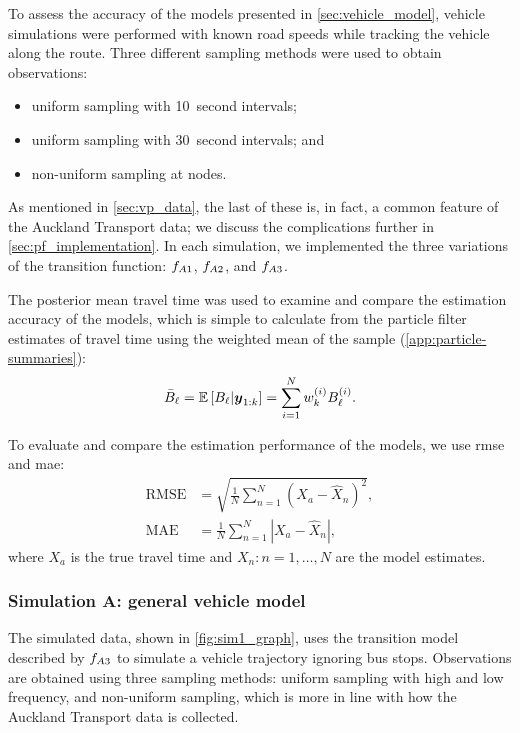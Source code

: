 To assess the accuracy of the models presented in \cref{sec:vehicle_model}, vehicle simulations were performed with known road speeds while tracking the vehicle along the route. Three different sampling methods were used to obtain observations:
\begin{itemize}
\item uniform sampling with 10~second intervals;
\item uniform sampling with 30~second intervals; and
\item non-uniform sampling at nodes.
\end{itemize}
As mentioned in \cref{sec:vp_data}, the last of these is, in fact, a common feature of the Auckland Transport data; we discuss the complications further in \cref{sec:pf_implementation}. In each simulation, we implemented the three variations of the transition function: $f_{A1}$, $f_{A2}$, and $f_{A3}$.


The posterior mean travel time was used to examine and compare the estimation accuracy of the models, which is simple to calculate from the particle filter estimates of travel time using the weighted mean of the sample (\cref{app:particle-summaries}):
\begin{equation}
\label{eq:pf_travel_time_mean}
\bar{B}_\ell =
\mathbb{E}\left[B_\ell | \boldsymbol{y}_{1:k}\right] =
\sum_{i=1}^N w^{(i)}_k B^{(i)}_\ell.
\end{equation}


To evaluate and compare the estimation performance of the models, we use \gls{rmse} and \gls{mae}:
\begin{align}
\label{eq:pf_rmse}
\text{RMSE} &= \sqrt{\frac{1}{N}\sum_{n=1}^N \left(X_a - \hat X_n\right)^2}, \\
\label{eq:pf_mae}
\text{MAE} &= \frac{1}{N}\sum_{n=1}^N \left|X_a - \hat X_n\right|,
\end{align}
where $X_a$ is the true travel time and $X_n:n=1,\ldots,N$ are the model estimates.


\subsubsection{Simulation A: general vehicle model}
\label{sec:vehicle_sim_A}





The simulated data, shown in \cref{fig:sim1_graph}, uses the transition model described by $f_{A3}$ to simulate a vehicle trajectory ignoring bus stops. Observations are obtained using three sampling methods: uniform sampling with high and low frequency, and non-uniform sampling, which is more in line with how the Auckland Transport data is collected.



